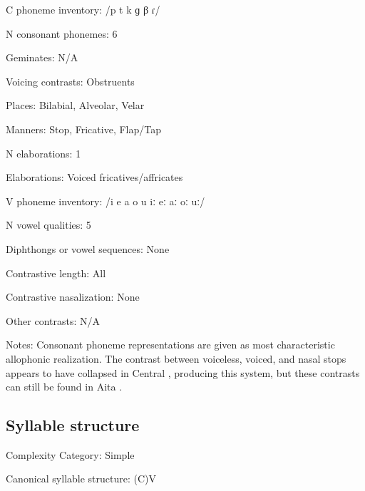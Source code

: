 {\begin{appendixdesc}
\item[C phoneme inventory:] /p t k ɡ β ɾ/

\item[N consonant phonemes:] 6

\item[Geminates:] N/A

\item[Voicing contrasts:] Obstruents

\item[Places:] Bilabial, Alveolar, Velar

\item[Manners:] Stop, Fricative, Flap/Tap

\item[N elaborations:] 1

\item[Elaborations:] Voiced fricatives/affricates

\item[V phoneme inventory:] /i e a o u iː eː aː oː uː/

\item[N vowel qualities:] 5

\item[Diphthongs or vowel sequences:] None

\item[Contrastive length:] All

\item[Contrastive nasalization:] None

\item[Other contrasts:] N/A

\item[Notes:] Consonant phoneme representations are given as most characteristic allophonic realization. The contrast between voiceless, voiced, and nasal stops appears to have collapsed in Central , producing this system, but these contrasts can still be found in Aita  \citep{Robinson2006}.
\end{appendixdesc}
\subsection*{Syllable structure}
\begin{appendixdesc}

\item[Complexity Category:] Simple

\item[Canonical syllable structure:] (C)V \citep[28--29]{Robinson2011}


\end{appendixdesc}}
